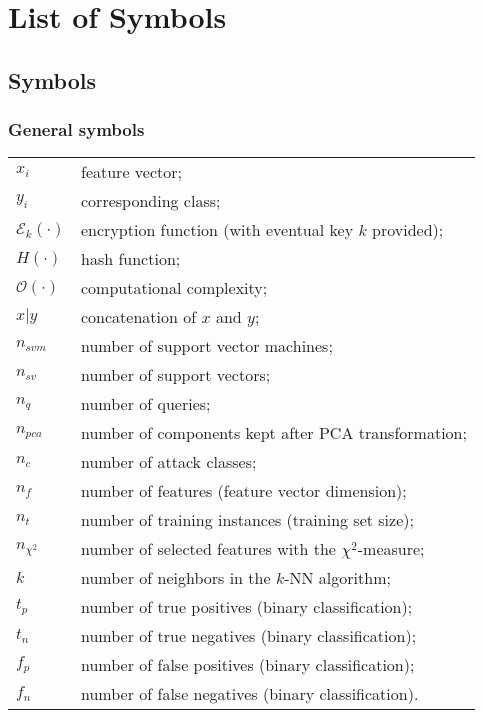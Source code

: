 \clearpage
{}
\listoffigures
\listoftables

\listofalgorithms
\chapter{List of Symbols}
\section*{Symbols}
    \subsection*{General symbols}
    \begin{flushleft}
  \renewcommand{\arraystretch}{1.1}
  \begin{tabularx}{\textwidth}{@{}p{12mm}X@{}}
    $x_i$ & feature vector; \\
    $y_i$ & corresponding class; \\
    $\mathcal{E}_k(\cdot)$ & encryption function (with eventual key $k$ provided); \\
    $H(\cdot)$ & hash function; \\
    $\mathcal{O}(\cdot)$ & computational complexity; \\
    $x|y$ & concatenation of $x$ and $y$; \\
    $n_{svm}$ & number of support vector machines; \\
    $n_{sv}$ & number of support vectors; \\
    $n_q$ & number of queries; \\
    $n_{pca}$ & number of components kept after PCA transformation; \\
    $n_c$ & number of attack classes; \\
    $n_f$ & number of features (feature vector dimension); \\
    $n_t$ & number of training instances (training set size); \\
    $n_{\chi^2}$ & number of selected features with the $\chi^2$-measure; \\
    $k$ & number of neighbors in the $k$-NN algorithm; \\
    $t_p$ & number of true positives (binary classification); \\
    $t_n$ & number of true negatives (binary classification); \\
    $f_p$ & number of false positives (binary classification); \\
    $f_n$ & number of false negatives (binary classification). \\
    \end{tabularx}
    \end{flushleft}
    
